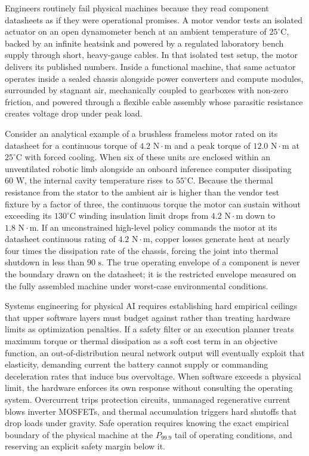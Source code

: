 \documentclass[
  letterpaper,
  DIV=11,
  numbers=noendperiod]{scrartcl}
\begin{document}
Engineers routinely fail physical machines because they read component
datasheets as if they were operational promises. A motor vendor tests an
isolated actuator on an open dynamometer bench at an ambient temperature
of \(25^\circ\text{C}\), backed by an infinite heatsink and powered by a
regulated laboratory bench supply through short, heavy-gauge cables. In
that isolated test setup, the motor delivers its published numbers.
Inside a functional machine, that same actuator operates inside a sealed
chassis alongside power converters and compute modules, surrounded by
stagnant air, mechanically coupled to gearboxes with non-zero friction,
and powered through a flexible cable assembly whose parasitic resistance
creates voltage drop under peak load.

Consider an analytical example of a brushless frameless motor rated on
its datasheet for a continuous torque of \(4.2\text{ N}\cdot\text{m}\)
and a peak torque of \(12.0\text{ N}\cdot\text{m}\) at
\(25^\circ\text{C}\) with forced cooling. When six of these units are
enclosed within an unventilated robotic limb alongside an onboard
inference computer dissipating \(60\text{ W}\), the internal cavity
temperature rises to \(55^\circ\text{C}\). Because the thermal
resistance from the stator to the ambient air is higher than the vendor
test fixture by a factor of three, the continuous torque the motor can
sustain without exceeding its \(130^\circ\text{C}\) winding insulation
limit drops from \(4.2\text{ N}\cdot\text{m}\) down to
\(1.8\text{ N}\cdot\text{m}\). If an unconstrained high-level policy
commands the motor at its datasheet continuous rating of
\(4.2\text{ N}\cdot\text{m}\), copper losses generate heat at nearly
four times the dissipation rate of the chassis, forcing the joint into
thermal shutdown in less than \(90\text{ s}\). The true operating
envelope of a component is never the boundary drawn on the datasheet; it
is the restricted envelope measured on the fully assembled machine under
worst-case environmental conditions.

Systems engineering for physical AI requires establishing hard empirical
ceilings that upper software layers must budget against rather than
treating hardware limits as optimization penalties. If a safety filter
or an execution planner treats maximum torque or thermal dissipation as
a soft cost term in an objective function, an out-of-distribution neural
network output will eventually exploit that elasticity, demanding
current the battery cannot supply or commanding deceleration rates that
induce bus overvoltage. When software exceeds a physical limit, the
hardware enforces its own response without consulting the operating
system. Overcurrent trips protection circuits, unmanaged regenerative
current blows inverter MOSFETs, and thermal accumulation triggers hard
shutoffs that drop loads under gravity. Safe operation requires knowing
the exact empirical boundary of the physical machine at the \(P_{99.9}\)
tail of operating conditions, and reserving an explicit safety margin
below it.
\end{document}
